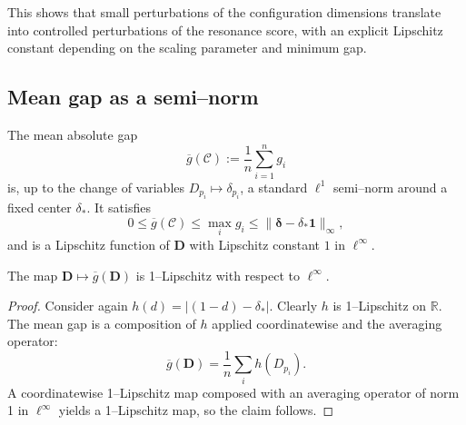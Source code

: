 \documentclass[11pt]{article}
\begin{document}
This shows that small perturbations of the configuration dimensions translate into controlled perturbations of the resonance score, with an explicit Lipschitz constant depending on the scaling parameter and minimum gap.

\subsection{Mean gap as a semi–norm}

The mean absolute gap
\[
  \overline{g}(\mathcal{C}) := \frac{1}{n}\sum_{i=1}^n g_i
\]
is, up to the change of variables \(D_{p_i}\mapsto \delta_{p_i}\), a standard \(\ell^1\) semi–norm around a fixed center \(\delta_\ast\). It satisfies
\[
  0 \le \overline{g}(\mathcal{C}) \le \max_i g_i \le \|\bm{\delta}-\delta_\ast\mathbf{1}\|_\infty,
\]
and is a Lipschitz function of \(\mathbf{D}\) with Lipschitz constant \(1\) in \(\ell^\infty\).

\begin{lemma}
The map \(\mathbf{D}\mapsto \overline{g}(\mathbf{D})\) is 1–Lipschitz with respect to \(\ell^\infty\).
\end{lemma}

\begin{proof}
Consider again \(h(d) = |(1-d) - \delta_\ast|\). Clearly \(h\) is 1–Lipschitz on \(\mathbb{R}\). The mean gap is a composition of \(h\) applied coordinatewise and the averaging operator:
\[
  \overline{g}(\mathbf{D}) = \frac{1}{n}\sum_i h(D_{p_i}).
\]
A coordinatewise 1–Lipschitz map composed with an averaging operator of norm 1 in \(\ell^\infty\) yields a 1–Lipschitz map, so the claim follows.
\end{proof}

\nocite{*}
  
  
\end{document}
